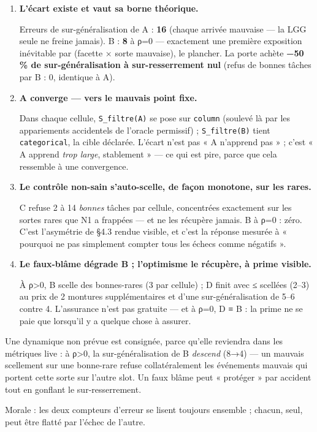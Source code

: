 \documentclass[11pt]{article}
\begin{document}
\begin{enumerate}
\item \textbf{L'écart existe et vaut sa borne théorique.} \par Erreurs de sur-généralisation de A : \textbf{16} (chaque arrivée mauvaise — la LGG seule ne freine jamais). B : \textbf{8} à ρ=0 — exactement une première exposition inévitable par (facette × sorte mauvaise), le plancher. La porte achète \textbf{−50 \% de sur-généralisation à sur-resserrement nul} (refus de bonnes tâches par B : 0, identique à A).

\item \textbf{A converge — vers le mauvais point fixe.} \par Dans chaque cellule, \texttt{S\_filtre(A)} se pose sur \texttt{column} (soulevé là par les appariements accidentels de l'oracle permissif) ; \texttt{S\_filtre(B)} tient \texttt{categorical}, la cible déclarée. L'écart n'est pas « A n'apprend pas » ; c'est « A apprend \emph{trop large}, stablement » — ce qui est pire, parce que cela ressemble à une convergence.

\item \textbf{Le contrôle non-sain s'auto-scelle, de façon monotone, sur les rares.} \par C refuse 2 à 14 \emph{bonnes} tâches par cellule, concentrées exactement sur les sortes rares que N1 a frappées — et ne les récupère jamais. B à ρ=0 : zéro. C'est l'asymétrie de §4.3 rendue visible, et c'est la réponse mesurée à « pourquoi ne pas simplement compter tous les échecs comme négatifs ».

\item \textbf{Le faux-blâme dégrade B ; l'optimisme le récupère, à prime visible.} \par À ρ>0, B scelle des bonnes-rares (3 par cellule) ; D finit avec ≤ scellées (2–3) au prix de 2 montures supplémentaires et d'une sur-généralisation de 5–6 contre 4. L'assurance n'est pas gratuite — et à ρ=0, D ≡ B : la prime ne se paie que lorsqu'il y a quelque chose à assurer.
\end{enumerate}

Une dynamique non prévue est consignée, parce qu'elle reviendra dans les métriques live : à ρ>0, la sur-généralisation de B \emph{descend} (8→4) — un mauvais scellement sur une bonne-rare refuse collatéralement les événements mauvais qui portent cette sorte sur l'autre slot. Un faux blâme peut « protéger » par accident tout en gonflant le sur-resserrement.

Morale : les deux compteurs d'erreur se lisent toujours ensemble ; chacun, seul, peut être flatté par l'échec de l'autre.
\end{document}
